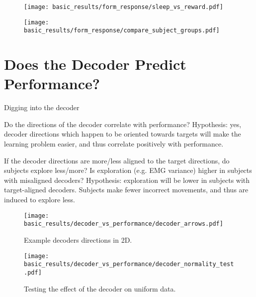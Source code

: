 \documentclass[../main.tex]{subfiles}
\begin{document}
\begin{figure}[tph]
    \centering
    \texttt{[image: basic\_results/form\_response/sleep\_vs\_reward.pdf]}
    \caption[Hours of sleep vs reward]{}\label{fig:sleep_vs_reward}
\end{figure}

\begin{figure}[tph]
    \centering
    \texttt{[image: basic\_results/form\_response/compare\_subject\_groups.pdf]}
    \caption[Subject group comparisons]{}\label{fig:compare_subject_groups}
\end{figure}



\section{Does the Decoder Predict Performance?}

Digging into the decoder

Do the directions of the decoder correlate with performance? 
    Hypothesis: yes, decoder directions which happen to be oriented towards targets will make the learning problem easier, and thus correlate positively with performance.

If the decoder directions are more/less aligned to the target directions, do subjects explore less/more? Is exploration (e.g. EMG variance) higher in subjects with misaligned decoders?
    Hypothesis: exploration will be lower in subjects with target-aligned decoders. Subjects make fewer incorrect movements, and thus are induced to explore less.

\begin{figure}[tph]
    \centering
    \texttt{[image: basic\_results/decoder\_vs\_performance/decoder\_arrows.pdf]}
    \caption[Example decoder directions in 2D.]{Example decoders directions in 2D.}\label{fig:decoder_arrows}
\end{figure}

\begin{figure}[tph]
    \centering
    \texttt{[image: basic\_results/decoder\_vs\_performance/decoder\_normality\_test.pdf]}
    \caption[Decoder normality testing]{Testing the effect of the decoder on uniform data.}\label{fig:decoder_normality}
\end{figure}
\end{document}
